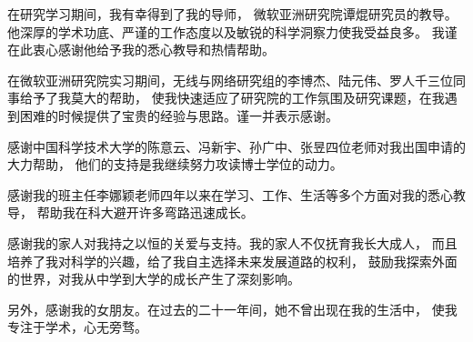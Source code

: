 \begin{acknowledgements}

在研究学习期间，我有幸得到了我的导师，
微软亚洲研究院谭焜研究员的教导。
他深厚的学术功底、严谨的工作态度以及敏锐的科学洞察力使我受益良多。
我谨在此衷心感谢他给予我的悉心教导和热情帮助。

在微软亚洲研究院实习期间，无线与网络研究组的李博杰、陆元伟、罗人千三位同事给予了我莫大的帮助，
使我快速适应了研究院的工作氛围及研究课题，在我遇到困难的时候提供了宝贵的经验与思路。谨一并表示感谢。

感谢中国科学技术大学的陈意云、冯新宇、孙广中、张昱四位老师对我出国申请的大力帮助，
他们的支持是我继续努力攻读博士学位的动力。

感谢我的班主任李娜颖老师四年以来在学习、工作、生活等多个方面对我的悉心教导，
帮助我在科大避开许多弯路迅速成长。

感谢我的家人对我持之以恒的关爱与支持。我的家人不仅抚育我长大成人，
而且培养了我对科学的兴趣，给了我自主选择未来发展道路的权利，
鼓励我探索外面的世界，对我从中学到大学的成长产生了深刻影响。

另外，感谢我的女朋友。在过去的二十一年间，她不曾出现在我的生活中，
使我专注于学术，心无旁骛。

\bigskip
{}

\end{acknowledgements}
